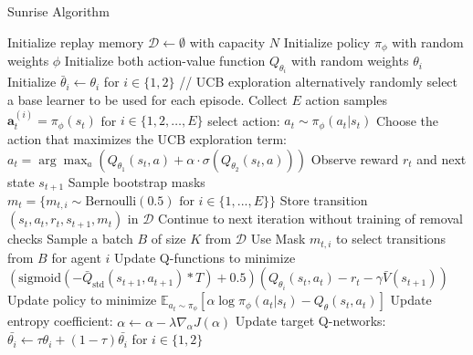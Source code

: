 \begin{algorithm}[H]
\caption{Sunrise Algorithm}
\begin{algorithmic}[1]
\State Initialize replay memory $\mathcal{D} \leftarrow \emptyset$ with capacity $N$
\State Initialize policy $\pi_{\phi}$ with random weights $\phi$
\State Initialize both action-value function $Q_{\theta_i}$ with random weights 
$\theta_i$
\State Initialize $\bar{\theta}_{i} \leftarrow \theta_{i}$ for $i \in \{1,2\}$
\Repeat
        \State // UCB exploration alternatively randomly select a base learner to be used for each episode.
        \State Collect $E$ action samples $\bm{a}_{t}^{(i)} = \pi_{\phi}(s_{t})$ for $i \in \{1,2,\ldots,E\}$
        \State select action: $a_{t} \sim \pi_{\phi}(a_{t} | s_{t})$
        \State Choose the action that maximizes the UCB exploration term:
        \State $a_{t} = \arg\max_{a} \left( Q_{\theta_1}(s_{t}, a) + \alpha \cdot \sigma(Q_{\theta_2}(s_{t}, a)) \right)$
        \State Observe reward $r_{t}$ and next state $s_{t+1}$
        \State Sample bootstrap masks $m_{t} = \{m_{t,i} \sim \text{Bernoulli}(0.5) \text{ for } i \in \{1,..., E\}\}$
        \State Store transition $(s_{t}, a_{t}, r_{t}, s_{t+1}, m_t)$ in $\mathcal{D}$
    \EndFor
        \State Continue to next iteration without training of removal checks
    \EndIf
        \State Sample a batch $B$ of size $K$ from $\mathcal{D}$
            \State Use Mask $m_{t,i}$ to select transitions from $B$ for agent $i$
            \State Update Q-functions to minimize $(\text{sigmoid}(-\bar{Q}_{\text{std}}(s_{t+1}, a_{t+1})*T)+0.5)(Q_{\theta_i}(s_t, a_t)-r_t-\gamma \bar{V}(s_{t+1}))$
            \State Update policy to minimize $\mathbb{E}_{a_t \sim \pi_\phi}\left[ \alpha \log \pi_\phi (a_t|s_t) - Q_\theta(s_t, a_t)\right]$
            \State Update entropy coefficient: $\alpha \gets \alpha - \lambda \hat{\nabla}_{\alpha} J(\alpha)$
            \State Update target Q-networks: $\bar{\theta_{i}} \gets \tau\theta_{i} + (1 - \tau) \bar{\theta_{i}}$ for $i \in \{1,2\}$
        \EndFor
    \EndFor
{}

\end{algorithmic}
\end{algorithm}
